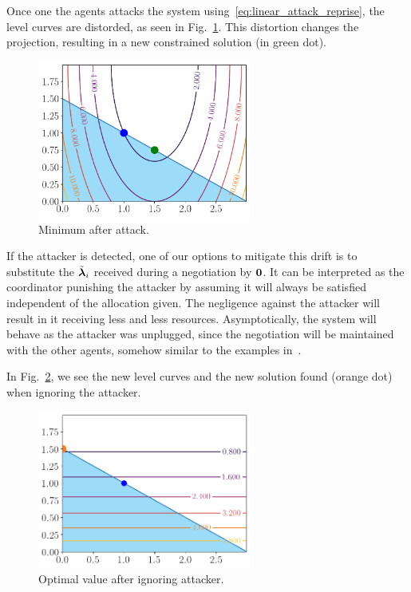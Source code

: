 \documentclass[../main.tex]{subfiles}
\begin{document}
Once one the agents attacks the system using~\eqref{eq:linear_attack_reprise}, the level curves are distorded, as seen in Fig.~\ref{fig:minimum_after_attack}.
This distortion changes the projection, resulting in a new constrained solution (in green dot).
\begin{figure}[h]
  \centering
  \includegraphics[width=7cm]{../img/resilient_eq/new-minimum-selfish.pdf}
  \caption{Minimum after attack.}\label{fig:minimum_after_attack}
\end{figure}

If the attacker is detected, one of our options to mitigate this drift is to substitute the $\tilde{\boldsymbol{\lambda}}_{i}$ received during a negotiation by $\mathbf{0}$.
It can be interpreted as the coordinator punishing the attacker by assuming it will always be satisfied independent of the allocation given.
The negligence against the attacker will result in it receiving less and less resources. Asymptotically, the system will behave as the attacker was unplugged, since the negotiation will be maintained with the other agents, somehow similar to the examples in~\cite{VelardeEtAl2018,MaestreEtAl2021}.

In Fig.~\ref{fig:minimum_ignoring_attacker}, we see the new level curves and the new solution found (orange dot) when ignoring the attacker.
\begin{figure}[h]
  \centering
  \includegraphics[width=7cm]{../img/resilient_eq/ignoreX.png}
  \caption{Optimal value after ignoring attacker.}\label{fig:minimum_ignoring_attacker}
\end{figure}
\end{document}

